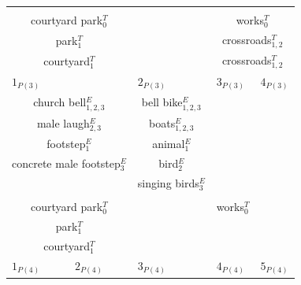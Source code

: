 \begin{table}[t]
\begin{tabular}{c|c|c|c|c|c|c}
\multicolumn{2}{c|}{}                               &					    & \multicolumn{4}{c}{} \\
\multicolumn{2}{c|}{courtyard park$_0^T$}           &                       & \multicolumn{4}{c}{works$_0^T$} \\                                                                     
\multicolumn{2}{c|}{park$_{1}^T$}                   &                       & \multicolumn{4}{c}{crossroads$_{1,2}^T$} \\                                                                                                                                 
\multicolumn{2}{c|}{courtyard$_{1}^T$}               &                       & \multicolumn{4}{c}{crossroads$_{1,2}^T$} \\                                                                                          
\hline
\multicolumn{2}{l|}{$1_{P(3)}$} & \multicolumn{1}{l|}{$2_{P(3)}$} & \multicolumn{3}{l|}{$3_{P(3)}$} & \multicolumn{1}{l}{$4_{P(3)}$} \\ 
\multicolumn{2}{c|}{church bell$_{1,2,3}^E$}        & bell bike$_{1,2,3}^E$ & \multicolumn{3}{c|}{}            &  \\         
\multicolumn{2}{c|}{male laugh$_{2,3}^E$}           & boats$_{1,2,3}^E$     & \multicolumn{3}{c|}{}            & \\ 
\multicolumn{2}{c|}{footstep$_{1}^E$}               & animal$_{1}^E$        & \multicolumn{3}{c|}{}            &  \\ 
\multicolumn{2}{c|}{concrete male footstep$_{3}^E$} & bird$_2^E$            & \multicolumn{3}{c|}{}            &  \\    
\multicolumn{2}{c|}{}                               & singing birds$_3^E$   & \multicolumn{3}{c|}{}            & \\			
\multicolumn{2}{c|}{}                               &                       & \multicolumn{3}{c|}{}            & \\		
\multicolumn{2}{c|}{courtyard park$_0^T$}           &                       & \multicolumn{3}{c|}{works$_0^T$} & \\	
\multicolumn{2}{c|}{park$_1^T$}                     &                       & \multicolumn{3}{c|}{}            & \\	
\multicolumn{2}{c|}{courtyard$_1^T$}                &                       & \multicolumn{3}{c|}{}            & \\   		           
\hline
\multicolumn{1}{l|}{$1_{P(4)}$} & \multicolumn{1}{l|}{$2_{P(4)}$} & \multicolumn{1}{l|}{$3_{P(4)}$}  & \multicolumn{3}{l|}{$4_{P(4)}$} & \multicolumn{1}{l}{$5_{P(4)}$} \\

\end{tabular}
\end{table}
